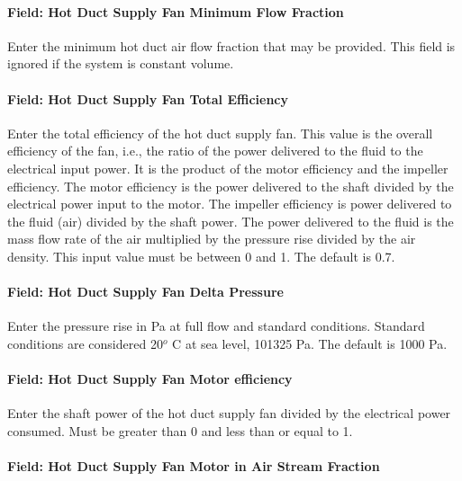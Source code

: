 \paragraph{Field: Hot Duct Supply Fan Minimum Flow Fraction}\label{field-hot-duct-supply-fan-minimum-flow-fraction}

Enter the minimum hot duct air flow fraction that may be provided. This field is ignored if the system is constant volume.

\paragraph{Field: Hot Duct Supply Fan Total Efficiency}\label{field-hot-duct-supply-fan-total-efficiency}

Enter the total efficiency of the hot duct supply fan. This value is the overall efficiency of the fan, i.e., the ratio of the power delivered to the fluid to the electrical input power. It is the product of the motor efficiency and the impeller efficiency. The motor efficiency is the power delivered to the shaft divided by the electrical power input to the motor. The impeller efficiency is power delivered to the fluid (air) divided by the shaft power. The power delivered to the fluid is the mass flow rate of the air multiplied by the pressure rise divided by the air density. This input value must be between 0 and 1. The default is 0.7.

\paragraph{Field: Hot Duct Supply Fan Delta Pressure}\label{field-hot-duct-supply-fan-delta-pressure}

Enter the pressure rise in Pa at full flow and standard conditions. Standard conditions are considered 20\(^{o}\) C at sea level, 101325 Pa. The default is 1000 Pa.

\paragraph{Field: Hot Duct Supply Fan Motor efficiency}\label{field-hot-duct-supply-fan-motor-efficiency}

Enter the shaft power of the hot duct supply fan divided by the electrical power consumed. Must be greater than 0 and less than or equal to 1.

\paragraph{Field: Hot Duct Supply Fan Motor in Air Stream Fraction}\label{field-hot-duct-supply-fan-motor-in-air-stream-fraction}

